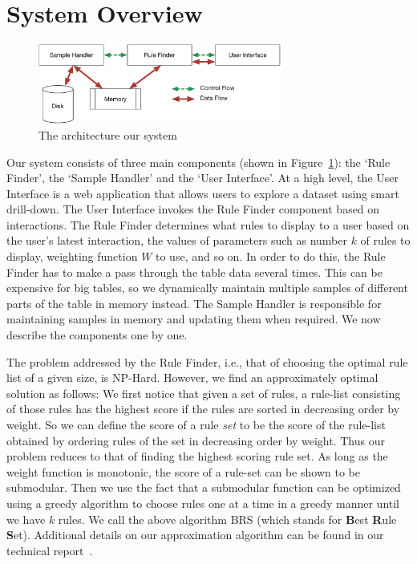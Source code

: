 
\section{System Overview}\label{sec:system}

\begin{figure}
\vspace{-5pt}
\centering
\includegraphics[width=80mm]{graphs/arch.pdf}
\vspace{-20pt}
\caption{The architecture our system \label{fig:system}}
\vspace{-15pt}
\end{figure}

Our system consists of three main components (shown in Figure~\ref{fig:system}): the `Rule Finder', the `Sample Handler' and the `User Interface'. 
At a high level, the User Interface is a web application that allows users to explore
a dataset using smart drill-down. The User Interface invokes the Rule Finder component based on interactions.
The Rule Finder determines what rules to display to a user based on the user's latest interaction, the values of parameters such as number $k$ of rules to display, weighting function $W$ to use, and so on. 
In order to do this, the Rule Finder has to make a pass through the table data several times. This can be expensive for big tables, so we dynamically maintain multiple samples of different parts of the table in memory instead. The Sample Handler is responsible for maintaining samples in memory and updating them when required. 
We now describe the components one by one.

 The problem addressed by the Rule Finder, i.e., that of choosing the optimal rule list of a given size, is NP-Hard. However, we find an approximately optimal solution as follows: We first notice that given a set of rules, a rule-list consisting of those rules has the highest score if the rules are sorted in decreasing order by weight. So we can define the score of a rule {\em set} to be the score of the rule-list obtained by ordering rules of the set in decreasing order by weight. Thus our problem reduces to that of finding the highest scoring rule set. As long as the weight function is monotonic, the score of a rule-set can be shown to be submodular. Then we use the fact that a submodular function can be optimized using a greedy algorithm to choose rules one at a time in a greedy manner until we have $k$ rules. We call the above algorithm BRS (which stands for {\bf B}est {\bf R}ule {\bf S}et). Additional details on our approximation algorithm can be found in our technical report~\cite{tr}. 

